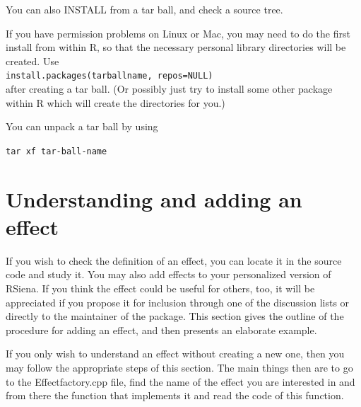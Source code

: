 \documentclass[a4paper,fleqn,11pt]{article}
\newcommand{\+}{\, + \,}
\newcommand{\rs}{{\sf RSiena}}
\begin{document}
{You can also \textsf{INSTALL} from a tar ball, and \textsf{check} a source
tree.

If you have permission problems on Linux or Mac, you may need to do the first
install from within \textsf{R}, so that the necessary personal library
directories will be created. Use\\
\verb|install.packages(tarballname, repos=NULL)| \\after creating a tar
ball. (Or possibly just try to install some other package within R which will
create the directories for you.)

You can unpack a tar ball by using

\verb|tar xf tar-ball-name|

\section{Understanding and adding an effect}

If you wish to check the definition of an effect,
you can locate it in the source code and study it.
You may also add
effects to your personalized version of \rs.
If you think the effect could be useful for others, too,
it will be appreciated if you propose it for inclusion through
one of the discussion lists or directly to the maintainer
of the package.
This section gives the outline of the procedure for adding an effect, and then presents
an elaborate example.

If you only wish to understand an effect without creating
a new one, then you may
follow the appropriate steps of this section.
The main things then are to go to the \textsf{Effectfactory.cpp}
file, find the name of the effect you are interested in and
from there the function that implements it
and read the code of this function.

\begin{enumerate}


\end{enumerate}}
\end{document}

